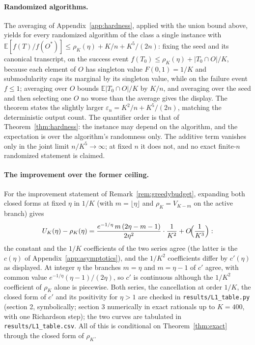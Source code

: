 \paragraph{Randomized algorithms.}
The averaging of Appendix~\ref{app:hardness}, applied with the union
bound above, yields for every randomized algorithm of the class a single
instance with
$\mathbb E[f(T)/f(O^{\ast})]\le\rho_K(\eta)+K/n+K^{5}/(2n)$: fixing the
seed and its canonical transcript, on the success event
$f(T_0)\le\rho_K(\eta)+|T_0\cap O|/K$, because each element of $O$ has
singleton value $F(0,1)=1/K$ and submodularity caps its marginal by its
singleton value, while on the failure event $f\le1$; averaging over $O$
bounds $\mathbb E|T_0\cap O|/K$ by $K/n$, and averaging over the seed and
then selecting one $O$ no worse than the average gives the display.  The
theorem states the slightly larger
$\varepsilon_n=K^{2}/n+K^{5}/(2n)$, matching the deterministic output
count.  The quantifier order is that of Theorem~\ref{thm:hardness}: the
instance may depend on the algorithm, and the expectation is over the
algorithm's randomness only.  The additive term vanishes only in the
joint limit $n/K^{5}\to\infty$; at fixed $n$ it does not, and no exact
finite-$n$ randomized statement is claimed.

\paragraph{The improvement over the former ceiling.}
For the improvement statement of Remark~\ref{rem:greedybudget}, expanding
both closed forms at fixed $\eta$ in $1/K$ (with $m=\lfloor\eta\rfloor$
and $\rho_K=V_{K-m}$ on the active branch) gives
\[
  U_K(\eta)-\rho_K(\eta)
  =\frac{e^{-1/\eta}\,m\,(2\eta-m-1)}{2\eta^{2}}\cdot\frac1{K^{2}}
  +O\!\Bigl(\frac1{K^{3}}\Bigr):
\]
the constant and the $1/K$ coefficients of the two series agree (the latter
is the $c(\eta)$ of Appendix~\ref{app:asymptotics}), and the $1/K^{2}$
coefficients differ by $c'(\eta)$ as displayed.  At integer $\eta$ the
branches $m=\eta$ and $m=\eta-1$ of $c'$ agree, with common value
$e^{-1/\eta}(\eta-1)/(2\eta)$, so $c'$ is continuous although the
$1/K^{2}$ coefficient of $\rho_K$ alone is piecewise.  Both series, the
cancellation at order $1/K$, the closed form of $c'$ and its positivity for
$\eta>1$ are checked in \texttt{results/L1\_table.py} (section 2,
symbolically; section 3 numerically in exact rationals up to $K=400$,
with one Richardson step); the two curves are tabulated in
\texttt{results/L1\_table.csv}.  All of this is conditional on
Theorem~\ref{thm:exact} through the closed form of $\rho_K$.

